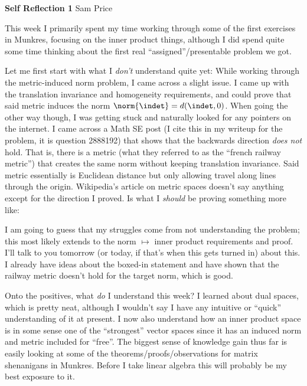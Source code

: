 \documentclass{article}
\begin{document}
\begin{center}
  \textbf{Self Reflection 1} \qquad Sam Price
\end{center}

This week I primarily spent my time working through some of the first exercises in Munkres, focusing on the inner product things, although I did spend quite some time thinking about the first real ``assigned''/presentable problem we got.

Let me first start with what I \emph{don't} understand quite yet: While working through the metric-induced norm problem, I came across a slight issue.
I came up with the translation invariance and homogeneity requirements, and could prove that said metric induces the norm $\norm{\indet} = d(\indet, 0)$.
When going the other way though, I was getting stuck and naturally looked for any pointers on the internet.
I came across a Math SE post (I cite this in my writeup for the problem, it is question 2888192)
that shows that the backwards direction \emph{does not} hold. That is, there is a metric (what they referred to as the ``french railway metric'') that creates the same norm without keeping translation invariance.
Said metric essentially is Euclidean distance but only allowing travel along lines through the origin.
Wikipedia's article on metric spaces doesn't say anything except for the direction I proved. Is what I \emph{should} be
proving something more like:
\begin{center}
\end{center}
I am going to guess that my struggles come from not understanding the problem; this most likely extends to the norm $\mapsto$ inner product requirements and proof. I'll talk to you tomorrow (or today, if that's when this gets turned in) about this.
I already have ideas about the boxed-in statement and have shown that the railway metric
doesn't hold for the target norm, which is good.

Onto the positives, what \emph{do} I understand this week? I learned about dual spaces, which is pretty neat, although I wouldn't say I have any intuitive or ``quick'' understanding of it at present.
I now also understand how an inner product space is in some sense one of the ``strongest'' vector spaces
since it has an induced norm and metric included for ``free''.
The biggest sense of knowledge gain thus far is easily looking at some of the theorems/proofs/observations
for matrix shenanigans in Munkres. Before I take linear algebra this will probably be my best exposure to it.
\end{document}
